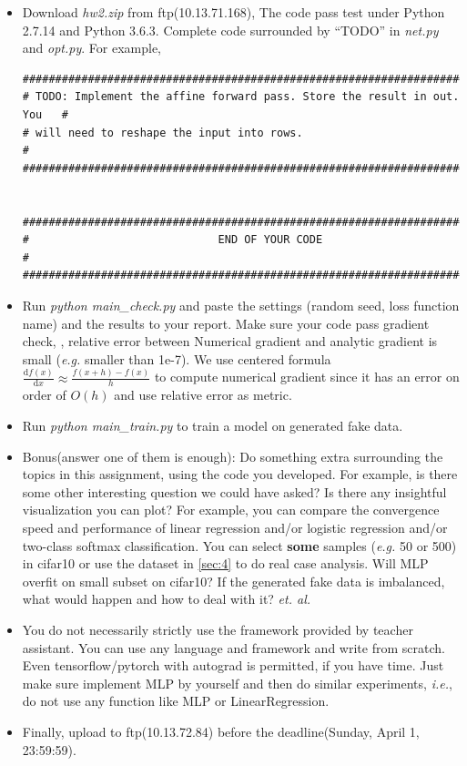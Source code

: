 \documentclass[12pt]{article}
\begin{document}
\begin{itemize}

	\item Download \textit{hw2.zip} from ftp(10.13.71.168), The code pass test under Python 2.7.14 and Python 3.6.3. Complete code surrounded by ``TODO'' in \textit{net.py} and \textit{opt.py}. For example,
	      \begin{verbatim}
###########################################################################
# TODO: Implement the affine forward pass. Store the result in out. You   #
# will need to reshape the input into rows.                               #
###########################################################################


###########################################################################
#                             END OF YOUR CODE                            #
###########################################################################
	\end{verbatim}
	\item Run \textit{python main\_check.py} and paste the settings (\eg random seed, loss function name) and the results to  your report.  Make sure your code pass gradient check, \eg, relative error between Numerical gradient and analytic gradient is small (\textit{e.g.} smaller than 1e-7). We use centered formula $\displaystyle \frac{\mathrm{d}f(x)}{\mathrm{d}x} \approx \frac{f(x+h)-f(x)}{h}$ to compute numerical gradient since it has an error on order of $O(h)$ and use relative error as metric.
	\item Run \textit{python main\_train.py} to train a model on generated fake data.
	\item {{Bonus(answer one of them is enough)}}: Do something extra surrounding the topics in this assignment, using the code you developed. For example, is there some other interesting question we could have asked? Is there any insightful visualization you can plot? For example, you can compare the convergence speed and performance of  linear regression and/or logistic regression and/or two-class softmax classification. You can select \textbf{some} samples (\textit{e.g.} 50 or 500) in cifar10 or use the dataset in {\ref{sec:4}} to do real case analysis. Will MLP overfit on small subset on cifar10? If the generated fake data is imbalanced, what would happen and how to deal with it?  \textit{et. al.}
	\item You do not necessarily strictly use the framework provided by teacher assistant. You can use any language and framework and write from scratch.
	      Even tensorflow/pytorch with autograd is permitted, if you have time.
	      Just make sure implement MLP by yourself and then do similar experiments, \textit{i.e.}, do not use any function like MLP or LinearRegression.
	\item Finally, upload to ftp(10.13.72.84) before the deadline(Sunday, April 1, 23:59:59).
\end{itemize}
\end{document}

